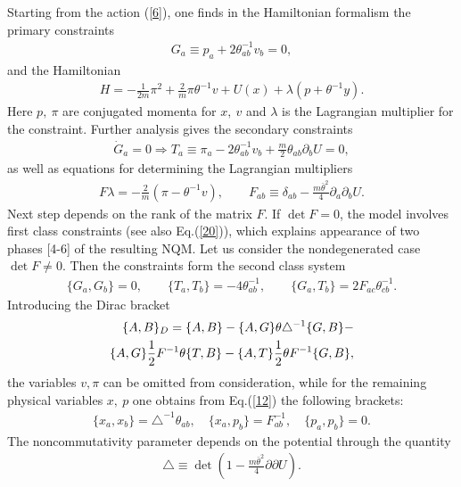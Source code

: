 \documentclass[paper a4]{article}
\begin{document}
Starting from the action (\ref{6}), one finds in the Hamiltonian
formalism the primary constraints
\begin{eqnarray}\label{11}
G_a\equiv p_a+2\theta^{-1}_{ab}v_b=0,
\end{eqnarray}
and the Hamiltonian
\begin{eqnarray}\label{16}
H=-\frac{1}{2m}\pi^2+\frac{2}{m}\pi\theta^{-1}v+U(x)+
\lambda(p+\theta^{-1}y).
\end{eqnarray}
Here $p, ~ \pi$ are conjugated momenta for $x, ~ v$ and $\lambda$ is the
Lagrangian multiplier for the constraint. Further analysis gives
the secondary constraints
\begin{eqnarray}\label{17}
\dot G_a=0 \Longrightarrow
T_{a}\equiv\pi_a-2\theta^{-1}_{ab}v_b+\frac{m}{2}\theta_{ab}\partial_bU=0,
\end{eqnarray}
as well as equations for determining the Lagrangian multipliers
\begin{eqnarray}\label{18}
F\lambda=-\frac{2}{m}(\pi-\theta^{-1}v), \qquad
F_{ab}\equiv\delta_{ab}-\frac{m\bar\theta^2}{4}\partial_a\partial_b U.
\end{eqnarray}
Next step depends on the rank of the matrix $F$. If $\det F=0$, the model
involves first class constraints (see also Eq.(\ref{20})), which explains
appearance of two phases [4-6] of the resulting NQM. Let us consider the
nondegenerated case $\det F\ne 0$.
Then the constraints form the second class system
\begin{eqnarray}\label{20}
\{G_a, G_b\}=0, \qquad \{T_a, T_b\}=-4\theta^{-1}_{ab}, \qquad
\{G_a, T_b\}=2F_{ac}\theta^{-1}_{cb}.
\end{eqnarray}
Introducing the Dirac bracket
\begin{eqnarray}\label{12}
\{A, B\}_D=\{A, B\}-\{A, G\}\theta\triangle^{-1}\{G, B\}- \cr
\{A, G\}\frac{1}{2}F^{-1}\theta\{T, B\}-
\{A, T\}\frac{1}{2}\theta F^{-1}\{G, B\},
\end{eqnarray}
the variables $v, \pi$ can be omitted from consideration, while
for the remaining physical variables $x, ~ p$ one obtains from
Eq.(\ref{12}) the following brackets:
\begin{eqnarray}\label{21}
\{x_a, x_b\}=\triangle^{-1}\theta_{ab}, \quad
\{x_a, p_b\}=F^{-1}_{ab},
\quad \{p_a, p_b\}=0.
\end{eqnarray}
The noncommutativity parameter depends on the potential through the
quantity
\begin{eqnarray}\label{22}
\triangle\equiv\det(1-\frac{m\bar\theta^2}{4}\partial\partial U).
\end{eqnarray}
\end{document}
